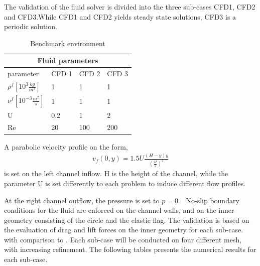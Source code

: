 The validation of the fluid solver is divided into the three sub-cases CFD1, CFD2 and CFD3.While  CFD1 and CFD2 yields steady state solutions, CFD3 is a periodic solution.


\begin{table}[h!]
\centering
\caption{Benchmark environment}
\label{my-label}
\begin{tabular}{ |p{3cm}||p{2cm}|p{2cm}|p{2cm}|  }
 \hline
 \multicolumn{4}{|c|}{Fluid parameters} \\
 \hline
 parameter              & CFD 1 & CFD 2 & CFD 3 \\
 \hline
$\rho^f [10^{3}\frac{kg}{m^3}]$ & 1    & 1    & 1    \\
$\nu^f  [10^{-3}\frac{m^2}{s}]$  & 1    & 1    & 1    \\
U                      & 0.2  & 1    & 2    \\
Re                     & 20   & 100  & 200 \\
\hline
\end{tabular}
\end{table}

A parabolic velocity profile on the form,
\begin{align*}
v_f(0, y) = 1.5 U\frac{(H -y)y}{(\frac{H}{2})^2}
\end{align*}
is set on the left channel inflow. H is the height of the channel, while the parameter U is set differently to each problem to induce different flow profiles. \

At the right channel outflow, the pressure is set to $p = 0$. \
No-slip boundary conditions for the fluid are enforced on the channel walls, and on the inner geometry consisting of the circle and the elastic flag.
The validation is based on the evaluation of drag and lift forces on the inner geometry for each sub-case.  with comparison to \cite{Hron2006}. Each sub-case will be conducted on four different mesh, with increasing refinement.  The following tables presents the numerical results for each sub-case.

\newpage

